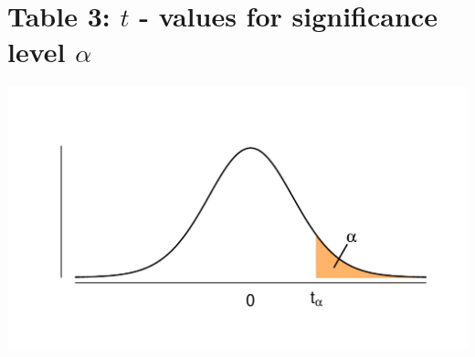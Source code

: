 \section{Table 3: $t$ - values for significance level $\alpha$}
\label{table3}

\vspace*{-30pt}
\begin{minipage}{0.6\textwidth}
\hfill
\end{minipage}
\begin{minipage}{0.4\textwidth}
\includegraphics[width=\textwidth]{Files/Images/tdist.pdf}
\end{minipage}

